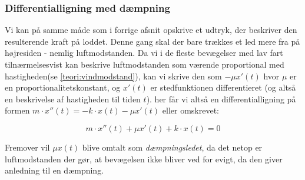 \subsubsection{Differentialligning med dæmpning}\label{teori: Opstilling af ligning med dampning}
Vi kan på samme måde som i forrige afsnit opskrive et udtryk, der beskriver den resulterende kraft på loddet. 
Denne gang skal der bare trækkes et led mere fra på højresiden - nemlig luftmodstanden. 
Da vi i de fleste bevægelser med lav fart tilnærmelsesvist kan beskrive luftmodstanden som værende proportional med hastigheden\footnotemark(se \ref{teori:vindmodstand}), kan vi skrive den som $- \mu x'(t)$ hvor $\mu$ er en proportionalitetskonstant, og $x'(t)$ er stedfunktionen differentieret (og altså en beskrivelse af hastigheden til tiden $t$).
her får vi altså en differentialligning på formen $m\cdot x''(t)=-k\cdot x(t)-\mu x'(t)$ eller omskrevet:

\begin{equation}
m\cdot x''(t)+\mu x'(t)+k\cdot x(t)=0
\end{equation}

Fremover vil $\mu x(t)$ blive omtalt som \textit{dæmpningsledet}, da det netop er luftmodstanden der gør, at bevægelsen ikke bliver ved for evigt, da den giver anledning til en dæmpning. 
